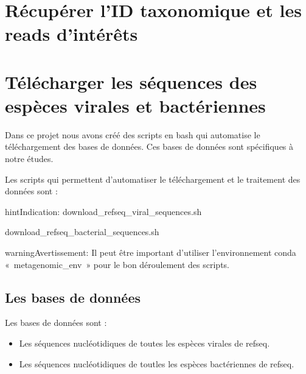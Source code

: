 \documentclass[letterpaper,10pt,french]{sphinxmanual}
\begin{document}
\section{Récupérer l’ID taxonomique et les reads d’intérêts}
\label{\detokenize{cluster/cluster_launch_get_id_and_reads.sh:recuperer-l-id-taxonomique-et-les-reads-d-interets}}\label{\detokenize{cluster/cluster_launch_get_id_and_reads.sh::doc}}

\section{Télécharger les séquences des espèces virales et bactériennes}
\label{\detokenize{download/download_refseq_species_sequences.sh:telecharger-les-sequences-des-especes-virales-et-bacteriennes}}\label{\detokenize{download/download_refseq_species_sequences.sh::doc}}
Dans ce projet nous avons créé des scripts en bash qui automatise le téléchargement des bases de données. Ces bases de données sont spécifiques à notre études.

Les scripts qui permettent d’automatiser le téléchargement et le traitement des données sont :

\begin{sphinxadmonition}{hint}{Indication:}
download\_refseq\_viral\_sequences.sh

download\_refseq\_bacterial\_sequences.sh
\end{sphinxadmonition}

\begin{sphinxadmonition}{warning}{Avertissement:}
Il peut être important d’utiliser l’environnement conda « metagenomic\_env » pour le bon déroulement des scripts.
\end{sphinxadmonition}


\subsection{Les bases de données}
\label{\detokenize{download/download_refseq_species_sequences.sh:les-bases-de-donnees}}
Les bases de données sont :
\begin{itemize}
\item {} 
Les séquences nucléotidiques de toutes les espèces virales de refseq.

\item {} 
Les séquences nucléotidiques de toutles les espèces bactériennes de refseq.

\end{itemize}
\end{document}
